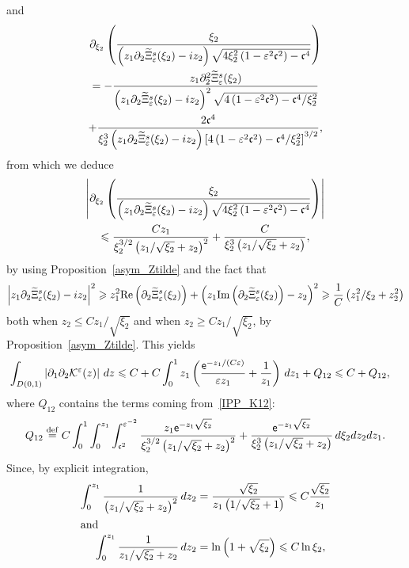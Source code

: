 \documentclass[AHL,Unicode,longabstracts,published]{cedram}
\newcommand*\p{\partial}
\newcommand*\ddef{\stackrel{\rm def}{=}}
\newcommand{\Imm}{\mathrm{Im}}
\newcommand{\Rel}{\mathrm{Re}}
\newcommand*\BK{\mathcal{K}}
\newcommand*\ex{{\sf e}}
\newcommand*\cs{{\mathfrak c}}
\newcommand*\gs{\geqslant }
\newcommand*\ls{\leqslant }
\newcommand*\e{\varepsilon}
\renewcommand*\t{\tilde}
\let\oldtilde\tilde
\renewcommand*{\tilde}[1]{\mathchoice{\widetilde{#1}}{\widetilde{#1}}{\oldtilde{#1}}{\oldtilde{#1}}}
\begin{document}
and
\begin{multline}\label{IPP_K12}
\p_{\xi_2}  \left(\frac{ \xi_2 }{\left(z_1 \p_2 \t\Xi_\e^s (\xi_2) - i z_2\right) \sqrt{ 4 \xi_2^2 \left(1 - \e^2 \cs^2\right) - \cs^4 } } \right)
\\
= - \frac{ z_1 \p_2^2 \t\Xi_\e^s (\xi_2) }{\left(z_1 \p_2 \t\Xi_\e^s (\xi_2) - i z_2\right)^2 \sqrt{ 4\left(1 - \e^2 \cs^2\right) - \cs^4 /\xi_2^2} }
\\ 
+ \frac{ 2 \cs^4 }{ \xi_2^3 \left(z_1 \p_2 \t\Xi_\e^s (\xi_2) - i z_2\right) \left[4 \left(1 - \e^2 \cs^2\right) - \cs^4 /\xi_2^2\right]^{3/2} },
\end{multline}
from which we deduce
\begin{multline*}
\left\lvert \p_{\xi_2} \left(\frac{ \xi_2 }{ \left(z_1 \p_2 \t\Xi_\e^s (\xi_2) - i z_2\right) \sqrt{ 4 \xi_2^2 \left(1 - \e^2 \cs^2\right) - \cs^4 } } \right) \right\lvert
\\ 
\ls \frac{ C z_1 }{ \xi_2^{3/2 } \left(z_1 / \sqrt{\xi_2 } + z_2\right)^2 } + \frac{ C }{ \xi_2^3 \left(z_1 / \sqrt{\xi_2 } + z_2\right) },
\end{multline*}
by using Proposition~\ref{asym_Ztilde} and the fact that
\[
\left\lvert z_1 \p_2 \t\Xi_\e^s (\xi_2) - i z_2 \right\rvert^2
\gs z_1^2 \Rel \left(\p_2 \t\Xi_\e^s (\xi_2)\right) + \left(z_1 {\Imm} \left(\p_2 \t\Xi_\e^s (\xi_2)\right) - z_2 \right)^2
\gs
\frac{1}{C} \left(z_1^2 / \xi_2 + z_2^2\right)
\]
both when $ z_2 \ls C z_1 / \sqrt{\xi_2 } $ and when $ z_2 \gs C z_1 / \sqrt{\xi_2 } $, by Proposition~\ref{asym_Ztilde}. This yields
\begin{align*}
\int_{D(0,1)} \left\lvert \p_1 \p_2 \BK^\e (z) \right\rvert \, dz & \ls C + C \int_0^1 z_1 \left(\frac{ \ex^{- z_1/(C \e) } }{ \e z_1 } + \frac{1}{z_1} \right) \, d z_1 + Q_{12}
\ls C + Q_{12},
\end{align*}
where $ Q_{12} $ contains the terms coming from~\eqref{IPP_K12}:
\begin{align*}
Q_{12} \ddef C \int_{0}^1 \int_{0}^{z_1} \int_{\cs^2}^{\e^{-2}} \frac{ z_1 \ex^{ - z_1 \sqrt{\xi_2 } } }{ \xi_2^{3/2 } \left(z_1 / \sqrt{\xi_2 } + z_2\right)^2 } + \frac{ \ex^{ - z_1 \sqrt{\xi_2 } } }{ \xi_2^3 \left(z_1 / \sqrt{\xi_2 } + z_2\right) } \, d\xi_2 dz_2dz_1.
\end{align*}
Since, by explicit integration,
\begin{align*}
\int_{0}^{z_1}  \frac{ 1 }{\left(z_1 / \sqrt{\xi_2 } + z_2\right)^2 } \, dz_2 &= \frac{ \sqrt{\xi_2 } }{ z_1 \left(1 / \sqrt{\xi_2 } + 1\right) }
\ls C \frac{ \sqrt{\xi_2 } }{ z_1 }
\\
\intertext{and}
\int_{0}^{z_1} \frac{1 }{ z_1 / \sqrt{\xi_2 } + z_2 } \, dz_2 &= \ln \left(1 + \sqrt{\xi_2 }\right)
\ls C \ln \xi_2,
\end{align*}
\end{document}
